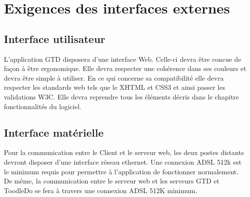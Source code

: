 
\chapter{Exigences des interfaces externes}
	\section{Interface utilisateur}

	L'application GTD disposera d'une interface Web. Celle-ci devra être concue de façon à être ergonomique. Elle devra respecter une cohérence dans ses couleurs et devra être simple à utiliser. En ce qui concerne sa compatibilité elle devra respecter les standards web tels que le XHTML et CSS3 et ainsi passer les validations W3C. Elle devra reprendre tous les éléments décris dans le chapitre fonctionnalités du logiciel.
	
	\section{Interface matérielle}

Pour la communication entre le Client et le serveur web, les deux postes distants devront disposer d'une interface réseau ethernet. Une connexion ADSL 512k est le minimum requis pour permettre à l'application de fonctionner normalement. De même, la communication entre le serveur web et les serveurs GTD et ToodleDo se fera à travers une connexion ADSL 512K minimum.





